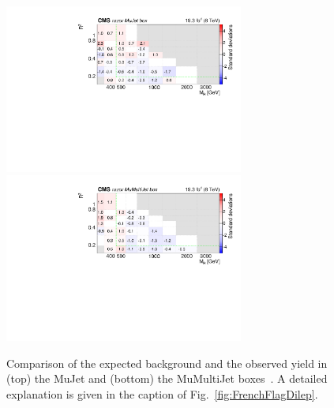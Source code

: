 \begin{figure}[tb!]
\centering
\includegraphics[width=0.7\textwidth]{figs/analysis8TeV/nSigmaLog_MuJet.pdf}
\includegraphics[width=0.7\textwidth]{figs/analysis8TeV/nSigmaLog_MuMultiJet.pdf}
\caption{Comparison of the expected background and the observed yield
  in (top) the MuJet and (bottom) the MuMultiJet boxes~\cite{razor8TeV,jmgd}. A detailed explanation is given in the caption of
  Fig.~\ref{fig:FrenchFlagDilep}.\label{fig:FrenchFlagMu}}
\end{figure}

